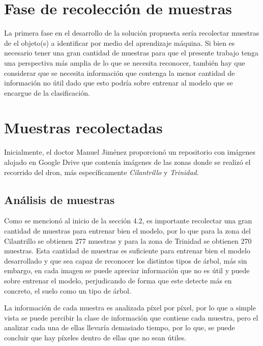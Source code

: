 \section{Fase de recolección de muestras}
La primera fase en el desarrollo de la solución propuesta sería recolectar muestras de el objeto(s) a identificar por medio del aprendizaje máquina. Si bien es necesario tener una gran cantidad de muestras para que el presente trabajo tenga una perspectiva más amplia de lo que se necesita reconocer, también hay que considerar que se necesita información que contenga la menor cantidad de información no útil dado que esto podría sobre entrenar al modelo que se encargue de la clasificación.

\clearpage
\section{Muestras recolectadas}
Inicialmente, el doctor Manuel Jiménez proporcionó un repositorio con imágenes alojado en Google Drive que contenía imágenes de las zonas donde se realizó el recorrido del dron, más específicamente \emph{Cilantrillo} y \emph{Trinidad}.

\begin{figure}[h!]
 \centering
 \par
{}
\end{figure}

\clearpage
\subsection{Análisis de muestras}
Como se mencionó al inicio de la sección 4.2, es importante recolectar una gran cantidad de muestras para entrenar bien el modelo, por lo que para la zona del Cilantrillo se obtienen 277 muestras y para la zona de Trinidad se obtienen 270 muestras. Esta cantidad de muestras es suficiente para entrenar bien el modelo desarrollado y que sea capaz de reconocer los distintos tipos de árbol, más sin embargo, en cada imagen se puede apreciar información que no es útil y puede sobre entrenar el modelo, perjudicando de forma que este detecte más en concreto, el suelo como un tipo de árbol.

La información de cada muestra es analizada píxel por píxel, por lo que a simple vista se puede percibir la clase de información que contiene cada muestra, pero el analizar cada una de ellas llevaría demasiado tiempo, por lo que, se puede concluir que hay píxeles dentro de ellas que no sean útiles. 

